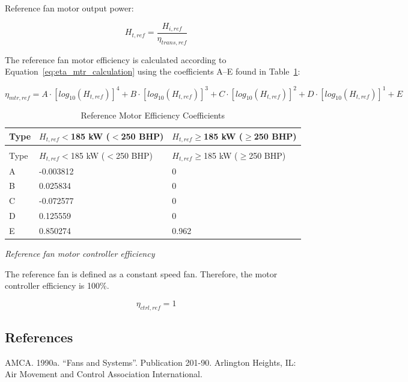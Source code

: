 Reference fan motor output power:

\begin{equation}
H_{t,ref}=\frac{H_{i,ref}}{\eta_{trans,ref}}
\label{eq:eta_ref_calculation}
\end{equation}

The reference fan motor efficiency is calculated according to Equation~\ref{eq:eta_mtr_calculation} using the coefficients A–E found in Table~\ref{table:reference-motor-efficiency-coefficients}:

\begin{equation}
\eta_{mtr,ref} = A\cdot[log_{10} (H_{t,ref})]^4 + B\cdot[log_{10} (H_{t,ref})]^3 +C\cdot[log_{10} (H_{t,ref})]^2 +D\cdot[log_{10} (H_{t,ref})]^1 + E
\label{eq:eta_mtr_calculation}
\end{equation}

\begin{longtable}[c]{p{1.0in}p{1.5in}p{1.5in}}
\caption{Reference Motor Efficiency Coefficients \label{table:reference-motor-efficiency-coefficients}} \tabularnewline
\toprule 
Type & \(H_{t,ref}\)$<$185 kW ($<$250 BHP) & \(H_{t,ref}\)$\geq$185 kW ($\geq$250 BHP) \tabularnewline \midrule
\midrule
\endfirsthead

\caption[]{Reference Motor Efficiency Coefficients} \tabularnewline
\toprule 
Type & \(H_{t,ref}\)$<$185 kW ($<$250 BHP) & \(H_{t,ref}\)$\geq$185 kW ($\geq$250 BHP) \tabularnewline \midrule
\midrule
\endhead

A & -0.003812 & 0 \tabularnewline
B & 0.025834 & 0 \tabularnewline
C & -0.072577 & 0 \tabularnewline
D & 0.125559 & 0 \tabularnewline
E & 0.850274 & 0.962 \tabularnewline
\bottomrule
\end{longtable}

\emph{Reference fan motor controller efficiency}


The reference fan is defined as a constant speed fan. Therefore, the motor controller efficiency is 100$\%$.

\begin{equation}
\eta_{ctrl,ref} = 1
\label{eq:eta_ctrl_calculation}
\end{equation}

\subsection{References}\label{references-002}

AMCA. 1990a. ``Fans and Systems''. Publication 201-90. Arlington Heights, IL: Air Movement and Control Association International.

